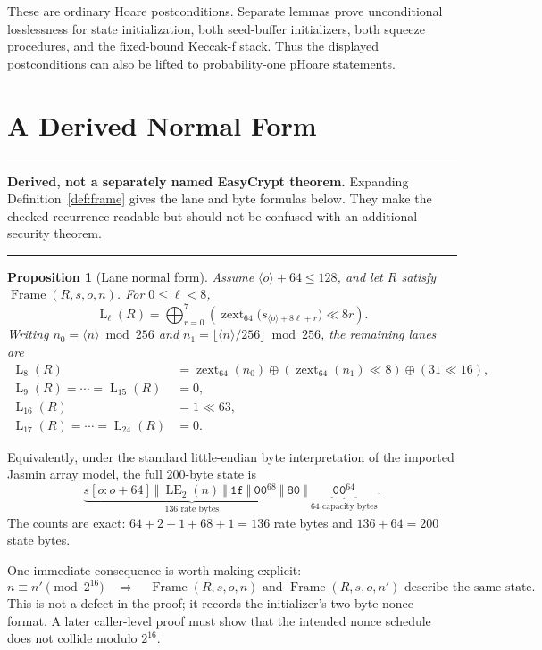\documentclass[11pt]{article}
\theoremstyle{definition}
\theoremstyle{plain}
\newtheorem{proposition}[theorem]{Proposition}
\theoremstyle{remark}
\newcommand{\uint}[1]{\langle #1\rangle}
\newcommand{\Lane}{\operatorname{L}}
\newcommand{\Frame}{\operatorname{Frame}}
\newcommand{\zext}{\operatorname{zext}_{64}}
\newenvironment{derivedbox}
  {\begin{center}\begin{minipage}{0.94\linewidth}\color{artifactblue}\hrule\vspace{0.6em}\color{black}}
  {\vspace{0.6em}\color{artifactblue}\hrule\end{minipage}\end{center}}
\begin{document}
These are ordinary Hoare postconditions.  Separate lemmas prove unconditional
losslessness for state initialization, both seed-buffer initializers, both
squeeze procedures, and the fixed-bound Keccak-f stack.  Thus the displayed
postconditions can also be lifted to probability-one pHoare statements.

\section{A Derived Normal Form}

\begin{derivedbox}
\textbf{Derived, not a separately named EasyCrypt theorem.}
Expanding Definition~\ref{def:frame} gives the lane and byte formulas below.
They make the checked recurrence readable but should not be confused with an
additional security theorem.
\end{derivedbox}

\begin{proposition}[Lane normal form]
\label{prop:lanes}
Assume $\uint{o}+64\le128$, and let $R$ satisfy $\Frame(R,s,o,n)$.  For
$0\le\ell<8$,
\[
  \Lane_\ell(R)
  =\bigoplus_{r=0}^{7}
    \left(
      \zext\bigl(s_{\uint{o}+8\ell+r}\bigr)\ll8r
    \right).
\]
Writing $n_0=\uint{n}\bmod256$ and
$n_1=\lfloor\uint{n}/256\rfloor\bmod256$, the remaining lanes are
\begin{align*}
  \Lane_8(R)
    &=\zext(n_0)\oplus(\zext(n_1)\ll8)\oplus(31\ll16),\\
  \Lane_9(R)=\cdots=\Lane_{15}(R)&=0,\\
  \Lane_{16}(R)&=1\ll63,\\
  \Lane_{17}(R)=\cdots=\Lane_{24}(R)&=0.
\end{align*}
\end{proposition}

Equivalently, under the standard little-endian byte interpretation of the
imported Jasmin array model, the full 200-byte state is
\begin{equation}
\label{eq:byte-normal}
\underbrace{
  s[o:o+64]\ \Vert\
  \operatorname{LE}_{2}(n)\ \Vert\
  \mathtt{1f}\ \Vert\
  \mathtt{00}^{68}\ \Vert\
  \mathtt{80}
}_{136\text{ rate bytes}}
\ \Vert\
\underbrace{\mathtt{00}^{64}}_{64\text{ capacity bytes}}.
\end{equation}
The counts are exact:
$64+2+1+68+1=136$ rate bytes and $136+64=200$ state bytes.

One immediate consequence is worth making explicit:
\[
  n\equiv n'\pmod{2^{16}}
  \quad\Longrightarrow\quad
  \Frame(R,s,o,n)\text{ and }\Frame(R,s,o,n')
  \text{ describe the same state}.
\]
This is not a defect in the proof; it records the initializer's two-byte nonce
format.  A later caller-level proof must show that the intended nonce schedule
does not collide modulo $2^{16}$.
\end{document}
